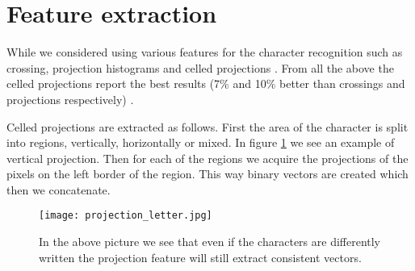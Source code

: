 
\section{Feature extraction}
\label{sec:feat}
While we considered using various features for the character recognition such as crossing, projection histograms and celled projections \cite{HWR:features1}\cite{HWR:features2}. From all the above the celled projections report the best results (7\% and 10\% better than crossings and projections respectively) \cite{HWR:features1}.

Celled projections are extracted as follows. First the area of the character is split into regions, vertically, horizontally or mixed. In figure \ref{fig:feature} we see an example of vertical projection. Then for each of the regions we acquire the projections of the pixels on the left border of the region. This way binary vectors are created which then we concatenate.

\begin{figure}[h]
\label{fig:feature}
\texttt{[image: projection\_letter.jpg]}
\caption{In the above picture we see that even if the characters are differently written the projection feature will still extract consistent vectors.}
\end{figure}